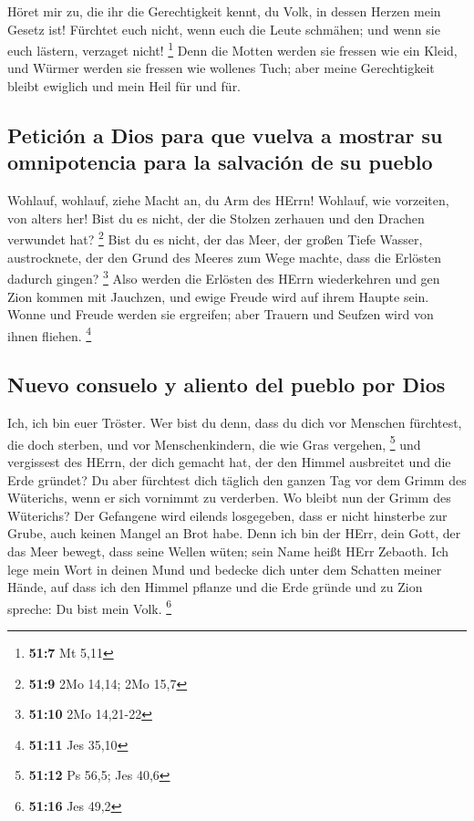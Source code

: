  Höret mir zu, die ihr die Gerechtigkeit kennt, du Volk,
in dessen Herzen mein Gesetz ist! Fürchtet euch nicht, wenn euch die
Leute schmähen; und wenn sie euch lästern, verzaget nicht! \footnote{\textbf{51:7}
  Mt 5,11}  Denn die Motten werden sie fressen wie ein
Kleid, und Würmer werden sie fressen wie wollenes Tuch; aber meine
Gerechtigkeit bleibt ewiglich und mein Heil für und für.

\hypertarget{peticiuxf3n-a-dios-para-que-vuelva-a-mostrar-su-omnipotencia-para-la-salvaciuxf3n-de-su-pueblo}{%
\subsection{Petición a Dios para que vuelva a mostrar su omnipotencia
para la salvación de su
pueblo}\label{peticiuxf3n-a-dios-para-que-vuelva-a-mostrar-su-omnipotencia-para-la-salvaciuxf3n-de-su-pueblo}}

 Wohlauf, wohlauf, ziehe Macht an, du Arm des HErrn!
Wohlauf, wie vorzeiten, von alters her! Bist du es nicht, der die
Stolzen zerhauen und den Drachen verwundet hat? \footnote{\textbf{51:9}
  2Mo 14,14; 2Mo 15,7}  Bist du es nicht, der das Meer,
der großen Tiefe Wasser, austrocknete, der den Grund des Meeres zum Wege
machte, dass die Erlösten dadurch gingen? \footnote{\textbf{51:10} 2Mo
  14,21-22}  Also werden die Erlösten des HErrn
wiederkehren und gen Zion kommen mit Jauchzen, und ewige Freude wird auf
ihrem Haupte sein. Wonne und Freude werden sie ergreifen; aber Trauern
und Seufzen wird von ihnen fliehen. \footnote{\textbf{51:11} Jes 35,10}

\hypertarget{nuevo-consuelo-y-aliento-del-pueblo-por-dios}{%
\subsection{Nuevo consuelo y aliento del pueblo por
Dios}\label{nuevo-consuelo-y-aliento-del-pueblo-por-dios}}

 Ich, ich bin euer Tröster. Wer bist du denn, dass du
dich vor Menschen fürchtest, die doch sterben, und vor Menschenkindern,
die wie Gras vergehen, \footnote{\textbf{51:12} Ps 56,5; Jes 40,6}
 und vergissest des HErrn, der dich gemacht hat, der den
Himmel ausbreitet und die Erde gründet? Du aber fürchtest dich täglich
den ganzen Tag vor dem Grimm des Wüterichs, wenn er sich vornimmt zu
verderben. Wo bleibt nun der Grimm des Wüterichs?  Der
Gefangene wird eilends losgegeben, dass er nicht hinsterbe zur Grube,
auch keinen Mangel an Brot habe.  Denn ich bin der HErr,
dein Gott, der das Meer bewegt, dass seine Wellen wüten; sein Name heißt
HErr Zebaoth.  Ich lege mein Wort in deinen Mund und
bedecke dich unter dem Schatten meiner Hände, auf dass ich den Himmel
pflanze und die Erde gründe und zu Zion spreche: Du bist mein Volk.
\footnote{\textbf{51:16} Jes 49,2}

